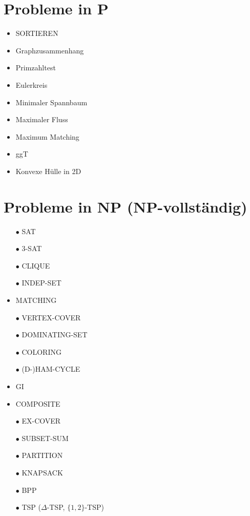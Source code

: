 \documentclass[a4paper,graphics,11pt]{article}
\begin{document}
\newpage

\section*{Probleme in \textsf{P}}

\begin{itemize}
    \item SORTIEREN
    \item Graphzusammenhang
    \item Primzahltest
    \item Eulerkreis
    \item Minimaler Spannbaum
    \item Maximaler Fluss
    \item Maximum Matching
    \item ggT
    \item Konvexe Hülle in 2D
\end{itemize}

\section*{Probleme in \textsf{NP} ({\color{red}\textsf{NP}-vollständig})}

\begin{itemize}
    \item[\color{red}$\bullet$] SAT
    \item[\color{red}$\bullet$] 3-SAT
    \item[\color{red}$\bullet$] CLIQUE
    \item[\color{red}$\bullet$] INDEP-SET
    \item MATCHING
    \item[\color{red}$\bullet$] VERTEX-COVER
    \item[\color{red}$\bullet$] DOMINATING-SET
    \item[\color{red}$\bullet$] COLORING
    \item[\color{red}$\bullet$] (D-)HAM-CYCLE
    \item GI
    \item COMPOSITE
    \item[\color{red}$\bullet$] EX-COVER
    \item[\color{red}$\bullet$] SUBSET-SUM
    \item[\color{red}$\bullet$] PARTITION
    \item[\color{red}$\bullet$] KNAPSACK
    \item[\color{red}$\bullet$] BPP
    \item[\color{red}$\bullet$] TSP ($\Delta$-TSP, $\{1,2\}$-TSP)
\end{itemize}
\end{document}
